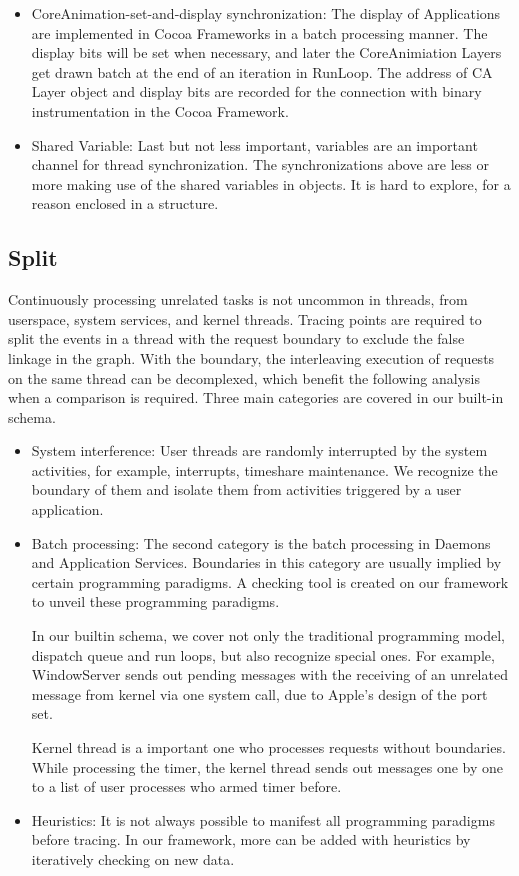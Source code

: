 \begin{itemize}
        \item CoreAnimation-set-and-display synchronization: The display of Applications are implemented in Cocoa Frameworks in a batch processing manner. The display bits will be set when necessary, and later the CoreAnimiation Layers get drawn batch at the end of an iteration in RunLoop. The address of CA Layer object and display bits are recorded for the connection with binary instrumentation in the Cocoa Framework.
        \item Shared Variable: Last but not less important, variables are an important channel for thread synchronization. The synchronizations above are less or more making use of the shared variables in objects. It is hard to explore, for a reason enclosed in a structure.
\end{itemize}

\subsection{Split}                                                                                                       
Continuously processing unrelated tasks is not uncommon in threads, from userspace, system services, and kernel threads.
Tracing points are required to split the events in a thread with the request boundary to exclude the false linkage in the graph.
With the boundary, the interleaving execution of requests on the same thread can be decomplexed, which benefit the following analysis when a comparison is required.
Three main categories are covered in our built-in schema.
\begin{itemize}
	\item System interference: User threads are randomly interrupted by the system activities, for example, interrupts, timeshare maintenance. We recognize the boundary of them and isolate them from activities triggered by a user application.
	\item Batch processing: The second category is the batch processing in Daemons and Application Services. Boundaries in this category are usually implied by certain programming paradigms. A checking tool is created on our framework to unveil these programming paradigms.

In our builtin schema, we cover not only the traditional programming model, dispatch queue and run loops, but also recognize special ones. For example, WindowServer sends out pending messages with the receiving of an unrelated message from kernel via one system call, due to Apple's design of the port set.

Kernel thread is a important one who processes requests without boundaries. While processing the timer, the kernel thread sends out messages one by one to a list of user processes who armed timer before.
	\item Heuristics: It is not always possible to manifest all programming paradigms before tracing. In our framework, more can be added with heuristics by iteratively checking on new data.
\end{itemize}

